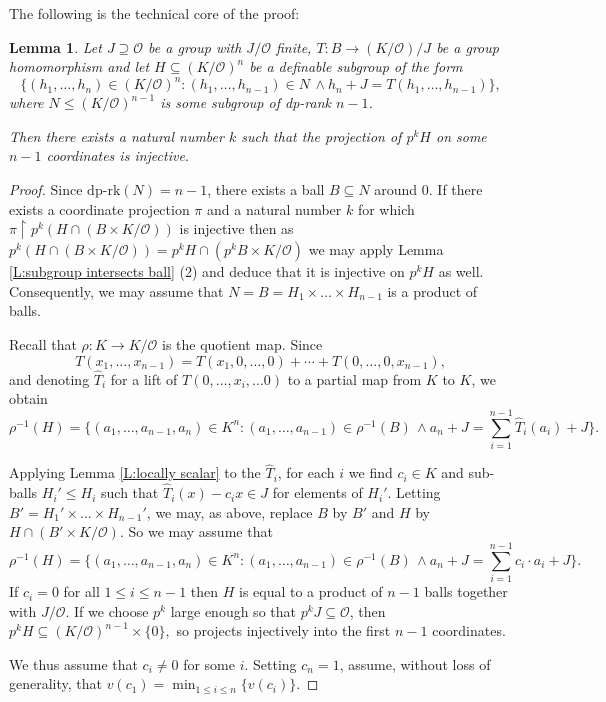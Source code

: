 \documentclass[11pt]{amsart}
\newtheorem{lemma}[theorem]{Lemma}
\theoremstyle{definition}
\newcommand{\CO}{{\mathcal O}}
\newcommand{\0}{\emptyset}
\newcommand{\rest}{\upharpoonright}
\def\dpr{\mathrm{dp\text{-}rk}}
\def\sub{\subseteq}
\begin{document}
The following is the technical core of the proof: 	
	
	\begin{lemma}\label{L:private case}
		Let $J\supseteq \CO$ be a group with $J/\CO$ finite, $T:B\to (K/\CO)/J$ be a group homomorphism and let $H\subseteq (K/\CO)^n$  be a definable subgroup of the form \[\{(h_1,\dots,h_n)\in (K/\CO)^n:(h_1,\dots,h_{n-1})\in N\, \wedge h_n+J= T(h_1,\dots,h_{n-1})\},\] where $N\leq (K/\CO)^{n-1}$ is some subgroup of dp-rank $n-1$.
		
		Then there exists a natural number $k$ 
		such that the projection of $p^{k}H$ on some $n-1$ coordinates is injective.
	\end{lemma}
	\begin{proof}
		Since $\dpr(N)=n-1$, there exists a ball $B\subseteq N$ around $0$. If there exists a coordinate projection $\pi$ and a natural number $k$ for which $\pi\rest p^k (H\cap (B\times K/\CO))$ is injective then as $p^k(H\cap (B\times K/\CO))=p^kH\cap (p^kB\times K/\CO)$ we may apply Lemma \ref{L:subgroup intersects ball} (2) and deduce that it is injective on $p^kH$ as well. Consequently, we may assume that $N=B=H_1\times \dots\times  H_{n-1}$ is a product of balls.
		
				Recall that  $\rho:K\to K/\CO$ is the  quotient map.  	
Since \[T(x_1,\ldots, x_{n-1})=T(x_1,0,\ldots, 0)+\cdots +T(0,\ldots, 0,x_{n-1}),\] and denoting  $\widehat T_i$  for a lift of $T(0,\dots,x_i,\dots 0)$ to a partial map from $K$ to $K$, we obtain
		\[\rho^{-1}(H)=\{(a_1,\dots,a_{n-1},a_n)\in K^n:(a_1,\dots,a_{n-1})\in \rho^{-1}(B)\, \wedge a_n+J= \sum_{i=1}^{n-1} \widehat T_i(a_i)+J\}.\]
		
		Applying Lemma  \ref{L:locally scalar} to the $\widehat T_i$,  for each $i$ we find $c_i\in K$  and sub-balls $H_i'\leq H_i$ such that $\widehat T_i(x)-c_ix\in J$ for elements of $H_i'$. Letting $B'=H_1'\times\dots \times H_{n-1}'$, we may, as above,  replace $B$ by $B'$ and $H$ by $H\cap (B'\times K/\CO)$. So we may assume that
		\[\rho^{-1}(H)=\{(a_1,\dots,a_{n-1},a_n)\in K^n:(a_1,\dots,a_{n-1})\in \rho^{-1}(B)\, \wedge a_n+J= \sum_{i=1}^{n-1} c_i\cdot a_i+J\}.\]
		If $c_i=0$ for all $1\leq i\leq n-1$ then $H$ is equal to a product of $n-1$ balls together with $J/\CO$. If we choose $p^k$ large enough so that $p^kJ \sub \CO$, then $p^kH \sub (K/\CO)^{n-1}\times \{0\},$ so projects injectively into the first $n-1$ coordinates.
		
		We thus assume that  $c_i\neq 0$  for some $i$.
		Setting $c_n=1$, assume, without loss of generality,  that $v(c_1)=\min_{1\leq i\leq n}\{v(c_i)\}$.
		

\end{proof}
\end{document}
